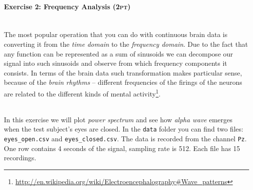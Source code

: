 \documentclass[a4paper,11pt]{article}
\newenvironment{exercise}[3]{\paragraph{Exercise #1: #2 \textsc{(#3pt)}}\ \\}{
\medskip}
\begin{document}
%
%
\begin{exercise}{2}{Frequency Analysis}{2}
The most popular operation that you can do with continuous brain data is converting it from the \emph{time domain} to the \emph{frequency domain}. Due to the fact that any function can be represented as a sum of sinusoids we can decompose our signal into such sinusoids and observe from which frequency components it consists. In terms of the brain data such transformation makes particular sense, because of the \emph{brain rhythms} -- different frequencies of the firings of the neurons are related to the different kinds of mental activity\footnote{\url{http://en.wikipedia.org/wiki/Electroencephalography\#Wave_patterns}}.

\ \\
In this exercise we will plot \emph{power spectrum} and see how \emph{alpha wave} emerges when the test subject's eyes are closed. In the \texttt{data} folder you can find two files: \texttt{eyes\_open.csv} and \texttt{eyes\_closed.csv}. The data is recorded from the channel \texttt{Pz}. One row contains 4 seconds of the signal, sampling rate is 512. Each file has 15 recordings.


\end{exercise}
\end{document}
